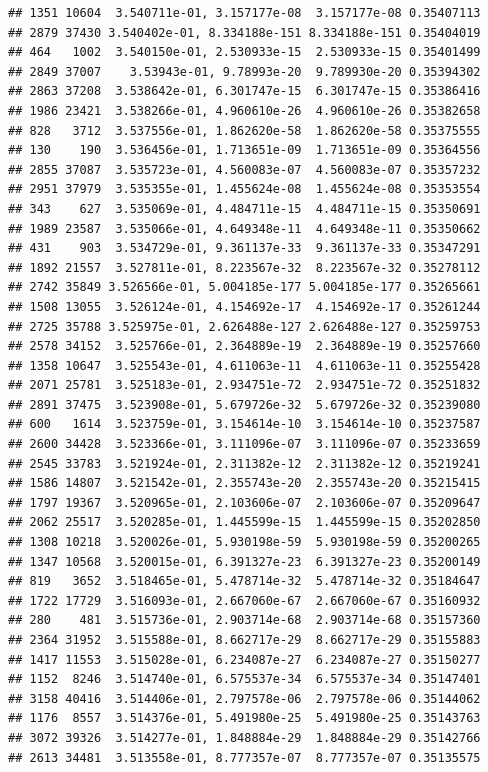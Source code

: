 \documentclass[
]{article}
\begin{document}
\begin{verbatim}
## 1351 10604  3.540711e-01, 3.157177e-08  3.157177e-08 0.35407113
## 2879 37430 3.540402e-01, 8.334188e-151 8.334188e-151 0.35404019
## 464   1002  3.540150e-01, 2.530933e-15  2.530933e-15 0.35401499
## 2849 37007    3.53943e-01, 9.78993e-20  9.789930e-20 0.35394302
## 2863 37208  3.538642e-01, 6.301747e-15  6.301747e-15 0.35386416
## 1986 23421  3.538266e-01, 4.960610e-26  4.960610e-26 0.35382658
## 828   3712  3.537556e-01, 1.862620e-58  1.862620e-58 0.35375555
## 130    190  3.536456e-01, 1.713651e-09  1.713651e-09 0.35364556
## 2855 37087  3.535723e-01, 4.560083e-07  4.560083e-07 0.35357232
## 2951 37979  3.535355e-01, 1.455624e-08  1.455624e-08 0.35353554
## 343    627  3.535069e-01, 4.484711e-15  4.484711e-15 0.35350691
## 1989 23587  3.535066e-01, 4.649348e-11  4.649348e-11 0.35350662
## 431    903  3.534729e-01, 9.361137e-33  9.361137e-33 0.35347291
## 1892 21557  3.527811e-01, 8.223567e-32  8.223567e-32 0.35278112
## 2742 35849 3.526566e-01, 5.004185e-177 5.004185e-177 0.35265661
## 1508 13055  3.526124e-01, 4.154692e-17  4.154692e-17 0.35261244
## 2725 35788 3.525975e-01, 2.626488e-127 2.626488e-127 0.35259753
## 2578 34152  3.525766e-01, 2.364889e-19  2.364889e-19 0.35257660
## 1358 10647  3.525543e-01, 4.611063e-11  4.611063e-11 0.35255428
## 2071 25781  3.525183e-01, 2.934751e-72  2.934751e-72 0.35251832
## 2891 37475  3.523908e-01, 5.679726e-32  5.679726e-32 0.35239080
## 600   1614  3.523759e-01, 3.154614e-10  3.154614e-10 0.35237587
## 2600 34428  3.523366e-01, 3.111096e-07  3.111096e-07 0.35233659
## 2545 33783  3.521924e-01, 2.311382e-12  2.311382e-12 0.35219241
## 1586 14807  3.521542e-01, 2.355743e-20  2.355743e-20 0.35215415
## 1797 19367  3.520965e-01, 2.103606e-07  2.103606e-07 0.35209647
## 2062 25517  3.520285e-01, 1.445599e-15  1.445599e-15 0.35202850
## 1308 10218  3.520026e-01, 5.930198e-59  5.930198e-59 0.35200265
## 1347 10568  3.520015e-01, 6.391327e-23  6.391327e-23 0.35200149
## 819   3652  3.518465e-01, 5.478714e-32  5.478714e-32 0.35184647
## 1722 17729  3.516093e-01, 2.667060e-67  2.667060e-67 0.35160932
## 280    481  3.515736e-01, 2.903714e-68  2.903714e-68 0.35157360
## 2364 31952  3.515588e-01, 8.662717e-29  8.662717e-29 0.35155883
## 1417 11553  3.515028e-01, 6.234087e-27  6.234087e-27 0.35150277
## 1152  8246  3.514740e-01, 6.575537e-34  6.575537e-34 0.35147401
## 3158 40416  3.514406e-01, 2.797578e-06  2.797578e-06 0.35144062
## 1176  8557  3.514376e-01, 5.491980e-25  5.491980e-25 0.35143763
## 3072 39326  3.514277e-01, 1.848884e-29  1.848884e-29 0.35142766
## 2613 34481  3.513558e-01, 8.777357e-07  8.777357e-07 0.35135575

\end{verbatim}
\end{document}
